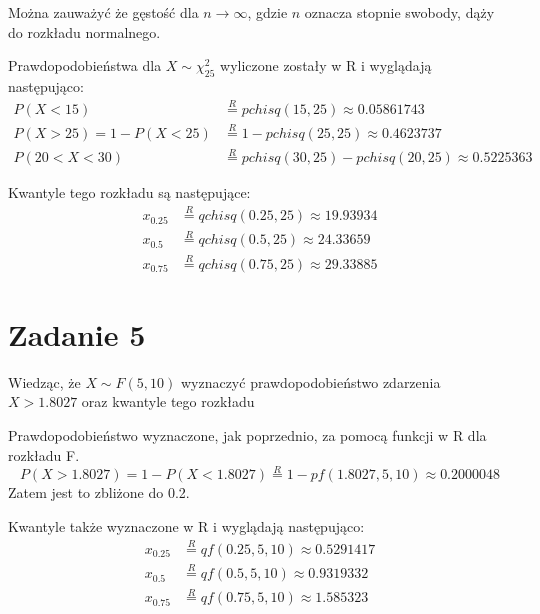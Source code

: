 \documentclass{article}
\begin{document}
Można zauważyć że gęstość dla $n \rightarrow \infty$, gdzie $n$ oznacza stopnie swobody, dąży do rozkładu normalnego.
\\ \par
Prawdopodobieństwa dla $X \sim \chi^2_{25}$ wyliczone zostały w R i wyglądają następująco: \\
\begin{align*}
P(X < 15) &\overset{R}{=} pchisq(15, 25) \approx 0.05861743 \\
P(X > 25) = 1 - P(X<25) &\overset{R}{=} 1- pchisq(25, 25) \approx 0.4623737 \\
P(20 < X < 30) &\overset{R}{=} pchisq(30, 25) - pchisq(20, 25) \approx 0.5225363
\end{align*}

Kwantyle tego rozkładu są następujące:
\begin{align*}
x_{0.25} &\overset{R}{=} qchisq(0.25, 25) \approx 19.93934 \\
x_{0.5} &\overset{R}{=} qchisq(0.5, 25) \approx 24.33659 \\
x_{0.75} &\overset{R}{=} qchisq(0.75, 25) \approx 29.33885  
\end{align*}

\newpage
\section*{Zadanie 5}
Wiedząc, że $X \sim F(5, 10)$ wyznaczyć prawdopodobieństwo zdarzenia
$X > 1.8027$ oraz kwantyle tego rozkładu \\ \par

Prawdopodobieństwo wyznaczone, jak poprzednio, za pomocą funkcji w R dla rozkładu F.
\[
P(X > 1.8027) = 1 - P(X < 1.8027) \overset{R}{=} 1 - pf(1.8027, 5, 10) \approx 0.2000048
\]
Zatem jest to zbliżone do 0.2. \\ \par

Kwantyle także wyznaczone w R i wyglądają następująco:
\begin{align*}
x_{0.25} &\overset{R}{=} qf(0.25, 5, 10) \approx 0.5291417 \\
x_{0.5} &\overset{R}{=} qf(0.5, 5, 10) \approx 0.9319332 \\
x_{0.75} &\overset{R}{=} qf(0.75, 5, 10) \approx 1.585323 
\end{align*}

\newpage
\end{document}
